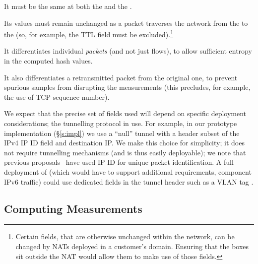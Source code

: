  It must be the same at both the \inbox and the \outbox.

 Its values must remain unchanged as a packet traverses the network from the \inbox to the \outbox (so, for example, the TTL field must be excluded).\footnote{Certain fields, that are otherwise unchanged within the network, can be changed by NATs deployed in a customer's domain. Ensuring that the \name boxes sit outside the NAT would allow them to make use of those fields.}

 It differentiates individual \emph{packets} (and not just flows), to allow sufficient entropy in the computed hash values.

 It also differentiates a retransmitted packet from the original one, to prevent spurious samples from disrupting the measurements (this precludes, for example, the use of TCP sequence number).

We expect that the precise set of fields used will depend on specific deployment considerations; \ie the tunnelling protocol in use.
For example, in our prototype implementation (\S\ref{s:impl}) we use a ``null'' tunnel with a header subset of the IPv4 IP ID field and destination IP. 
We make this choice for simplicity; it does not require tunnelling mechanisms (and is thus easily deployable); we note that previous proposals~\cite{ip-traceback} have used IP ID for unique packet identification. 
A full deployment  of \name (which would have to support additional requirements, \eg component IPv6 traffic) could use dedicated fields in the tunnel header such as a VLAN tag .

\subsection{Computing Measurements}
\label{s:measure:compute}
\newcommand{\pone}{$p_{i-1}$}
\newcommand{\hpone}{$h(p_{i-1})$}
\newcommand{\sone}{$s_{i-1}$}
\newcommand{\rone}{$r_{i-1}$}
\newcommand{\ptwo}{$p_{i}$}
\newcommand{\hptwo}{$h(p_{i})$}
\newcommand{\stwo}{$s_{i}$}
\newcommand{\rtwo}{$r_{i}$}
\newcommand{\atwo}{$a_{i}$}
\newcommand{\sentone}{$sent_{i-1}$}
\newcommand{\recvdone}{$rcvd_{i-1}$}
\newcommand{\senttwo}{$sent_{i}$}
\newcommand{\recvdtwo}{$rcvd_{i}$}


